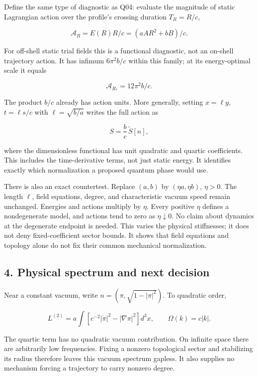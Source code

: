 \documentclass[11pt,a4paper]{article}
\begin{document}
Define the same type of diagnostic as Q04: evaluate the magnitude of
static Lagrangian action over the profile's crossing duration
\(T_R=R/c\),

\[\mathcal A_R=E(R)R/c=(aAR^2+bB)/c. \tag{5}\]

For off-shell static trial fields this is a functional diagnostic, not
an on-shell trajectory action. It has infimum \(6\pi^2 b/c\) within this
family; at its energy-optimal scale it equals

\[\mathcal A_{R_*}=12\pi^2 b/c. \tag{6}\]

The product \(b/c\) already has action units. More generally, setting
\(x=\ell y\), \(t=\ell s/c\) with \(\ell=\sqrt{b/a}\) writes the full
action as

\[S=\frac{b}{c}\,\widetilde S[n], \tag{7}\]

where the dimensionless functional has unit quadratic and quartic
coefficients. This includes the time-derivative terms, not just static
energy. It identifies exactly which normalization a proposed quantum
phase would use.

There is also an exact countertest. Replace \((a,b)\) by
\((\eta a,\eta b)\), \(\eta>0\). The length \(\ell\), field equations,
degree, and characteristic vacuum speed remain unchanged. Energies and
actions multiply by \(\eta\). Every positive \(\eta\) defines a
nondegenerate model, and actions tend to zero as \(\eta\downarrow0\). No
claim about dynamics at the degenerate endpoint is needed. This varies
the physical stiffnesses; it does not deny fixed-coefficient sector
bounds. It shows that field equations and topology alone do not fix
their common mechanical normalization.

\hypertarget{physical-spectrum-and-next-decision}{%
\subsection{4. Physical spectrum and next
decision}\label{physical-spectrum-and-next-decision}}

Near a constant vacuum, write \(n=(\pi,\sqrt{1-|\pi|^2})\). To quadratic
order,

\[L^{(2)}=a\int[c^{-2}|\dot\pi|^2-|\nabla\pi|^2]d^3x,
\qquad \Omega(k)=c|k|.\]

The quartic term has no quadratic vacuum contribution. On infinite space
there are arbitrarily low frequencies. Fixing a nonzero topological
sector and stabilizing its radius therefore leaves this vacuum spectrum
gapless. It also supplies no mechanism forcing a trajectory to carry
nonzero degree.
\end{document}
